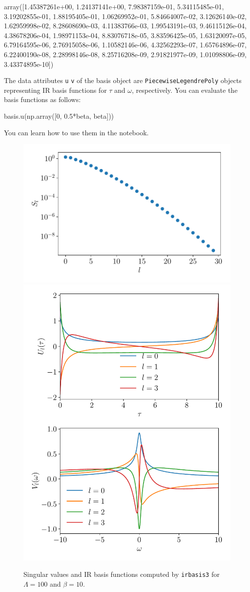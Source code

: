 \documentclass[submission, LectureNotes]{SciPost}
\begin{document}
\begin{python}
array([1.45387261e+00, 1.24137141e+00, 7.98387159e-01, 5.34115485e-01,
3.19202855e-01, 1.88195405e-01, 1.06269952e-01, 5.84664007e-02,
3.12626140e-02, 1.62959998e-02, 8.28608690e-03, 4.11383766e-03,
1.99543191e-03, 9.46115126e-04, 4.38678206e-04, 1.98971153e-04,
8.83076718e-05, 3.83596425e-05, 1.63120097e-05, 6.79164595e-06,
2.76915058e-06, 1.10582146e-06, 4.32562293e-07, 1.65764896e-07,
6.22400190e-08, 2.28998146e-08, 8.25716208e-09, 2.91821977e-09,
1.01098806e-09, 3.43374895e-10])
\end{python}

The data attributes \texttt{u} \texttt{v} of the basis object are
\texttt{PiecewiseLegendrePoly} objects representing IR basis functions
for $\tau$ and $\omega$, respectively.
You can evaluate the basis functions as follows:
\begin{python}
basis.u(np.array([0, 0.5*beta, beta]))
\end{python}
You can learn how to use them in the notebook.

\begin{figure}
    \centering
    \includegraphics[width=0.6\columnwidth]{ir_basis_svals.pdf}
    \includegraphics[width=0.6\columnwidth]{ir_basis_functions.pdf}
    \caption{
        Singular values and IR basis functions computed by \texttt{irbasis3} for $\Lambda=100$ and $\beta=10$.
    }
    \label{fig:irbasis}
\end{figure}
\end{document}
